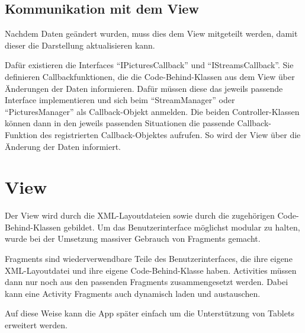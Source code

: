 \subsection{Kommunikation mit dem View}

Nachdem Daten geändert wurden, muss dies dem View mitgeteilt werden, damit dieser die Darstellung aktualisieren kann.

Dafür existieren die Interfaces \enquote{IPicturesCallback} und \enquote{IStreamsCallback}. Sie definieren Callbackfunktionen, die die Code-Behind-Klassen aus dem View über Änderungen der Daten informieren. Dafür müssen diese das jeweils passende Interface implementieren und sich beim \enquote{StreamManager} oder \enquote{PicturesManager} als Callback-Objekt anmelden. Die beiden Controller-Klassen können dann in den jeweils passenden Situationen die passende Callback-Funktion des registrierten Callback-Objektes aufrufen. So wird der View über die Änderung der Daten informiert.

\section{View}

Der View wird durch die XML-Layoutdateien sowie durch die zugehörigen Code-Behind-Klassen gebildet. Um das Benutzerinterface möglichst modular zu halten, wurde bei der Umsetzung massiver Gebrauch von Fragments gemacht.

Fragments sind wiederverwendbare Teile des Benutzerinterfaces, die ihre eigene XML-Layoutdatei und ihre eigene Code-Behind-Klasse haben. Activities müssen dann nur noch aus den passenden Fragments zusammengesetzt werden. Dabei kann eine Activity Fragments auch dynamisch laden und austauschen. 

Auf diese Weise kann die App später einfach um die Unterstützung von Tablets erweitert werden.

